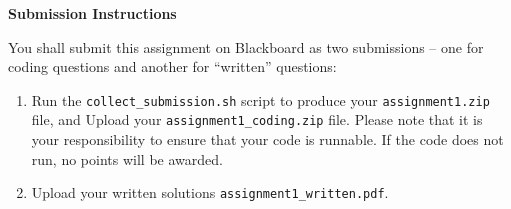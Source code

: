 \Large{\textbf{Submission Instructions}}

\normalsize

You shall submit this assignment on Blackboard as two submissions -- one for coding questions and another for ``written'' questions:
\begin{enumerate}
    \item Run the \texttt{collect\_submission.sh} script to produce your \texttt{assignment1.zip} file, and Upload your \texttt{assignment1\_coding.zip} file. Please note that it is your responsibility to ensure that your code is runnable. If the code does not run, no points will be awarded.
    \item Upload your written solutions  \texttt{assignment1\_written.pdf}.
\end{enumerate}